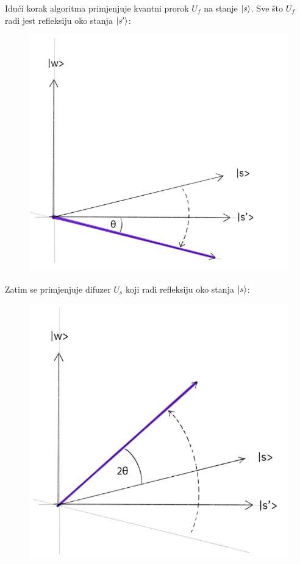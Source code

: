 Idući korak algoritma primjenjuje kvantni prorok $U_f$ na stanje $\ket{s}$. Sve što $U_f$ radi jest refleksiju oko stanja $\ket{s'}$:

\begin{figure}[H]
\centering
\includegraphics[scale=0.4]{img/grover2.png}
\end{figure}

Zatim se primjenjuje difuzer $U_s$ koji radi refleksiju oko stanja $\ket{s}$:

\begin{figure}[H]
\centering
\includegraphics[scale=0.4]{img/grover3.png}
\end{figure}

